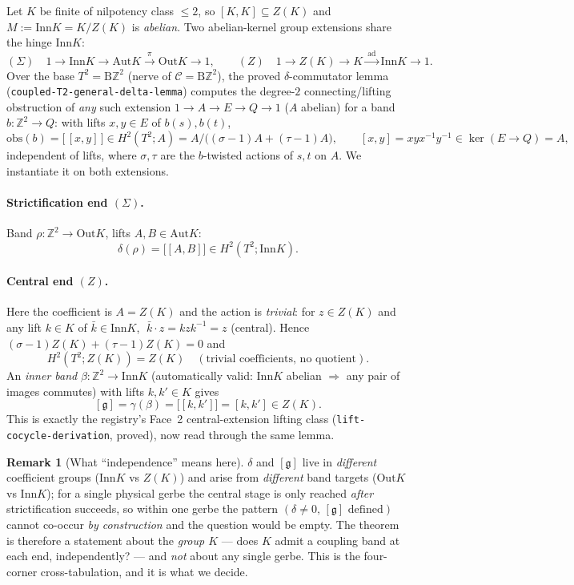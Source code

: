 \documentclass[11pt]{article}
\theoremstyle{definition}
\newtheorem{remark}[theorem]{Remark}
\newcommand{\C}{\mathcal{C}}
\newcommand{\Z}{\mathbb{Z}}
\newcommand{\Aut}{\mathrm{Aut}}
\newcommand{\Inn}{\mathrm{Inn}}
\newcommand{\Out}{\mathrm{Out}}
\newcommand{\gerbe}{\mathfrak{g}}
\newcommand{\B}{\mathrm{B}}
\newcommand{\Ad}{\mathrm{ad}}
\begin{document}
Let $K$ be finite of nilpotency class $\le 2$, so $[K,K]\subseteq Z(K)$ and
$M:=\Inn K=K/Z(K)$ is \emph{abelian}. Two abelian-kernel group extensions share the hinge
$\Inn K$:
\[
(\Sigma)\quad 1\to\Inn K\xrightarrow{\ }\Aut K\xrightarrow{\ \pi\ }\Out K\to1,
\qquad
(Z)\quad 1\to Z(K)\xrightarrow{\ }K\xrightarrow{\ \Ad\ }\Inn K\to1 .
\]
Over the base $T^2=\B\Z^2$ (nerve of $\C=\B\Z^2$), the proved $\delta$-commutator lemma
(\texttt{coupled-T2-general-delta-lemma}) computes the degree-$2$ connecting/lifting
obstruction of \emph{any} such extension $1\to A\to E\to Q\to1$ ($A$ abelian) for a band
$b:\Z^2\to Q$: with lifts $x,y\in E$ of $b(s),b(t)$,
\[
\mathrm{obs}(b)=\big[\,[x,y]\,\big]\in H^2(T^2;A)=A\big/\big((\sigma-1)A+(\tau-1)A\big),\qquad
[x,y]=xyx^{-1}y^{-1}\in\ker(E\to Q)=A,
\]
independent of lifts, where $\sigma,\tau$ are the $b$-twisted actions of $s,t$ on $A$. We
instantiate it on both extensions.

\paragraph{Strictification end $(\Sigma)$.} Band $\rho:\Z^2\to\Out K$, lifts
$A,B\in\Aut K$:
\[
\delta(\rho)=\big[[A,B]\big]\in H^2(T^2;\Inn K).
\]

\paragraph{Central end $(Z)$.} Here the coefficient is $A=Z(K)$ and the action is
\emph{trivial}: for $z\in Z(K)$ and any lift $k\in K$ of $\bar k\in\Inn K$,
$\;\bar k\cdot z=kzk^{-1}=z$ (central). Hence $(\sigma-1)Z(K)+(\tau-1)Z(K)=0$ and
\[
H^2(T^2;Z(K))=Z(K)\quad(\text{trivial coefficients, no quotient}).
\]
An \emph{inner band} $\beta:\Z^2\to\Inn K$ (automatically valid: $\Inn K$ abelian $\Rightarrow$
any pair of images commutes) with lifts $k,k'\in K$ gives
\[
[\gerbe]=\gamma(\beta)=\big[[k,k']\big]=[k,k']\in Z(K).
\]
This is exactly the registry's Face~2 central-extension lifting class
(\texttt{lift-cocycle-derivation}, proved), now read through the same lemma.

\begin{remark}[What ``independence'' means here]
$\delta$ and $[\gerbe]$ live in \emph{different} coefficient groups ($\Inn K$ vs $Z(K)$) and
arise from \emph{different} band targets ($\Out K$ vs $\Inn K$); for a single physical gerbe
the central stage is only reached \emph{after} strictification succeeds, so within one gerbe the
pattern $(\delta\neq0,\,[\gerbe]\text{ defined})$ cannot co-occur \emph{by construction} and the
question would be empty. The theorem is therefore a statement about the \emph{group $K$} --- does
$K$ admit a coupling band at each end, independently? --- and \emph{not} about any single gerbe.
This is the four-corner cross-tabulation, and it is what we decide.
\end{remark}
\end{document}
